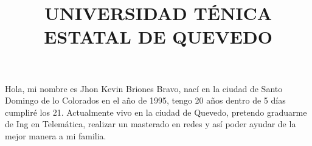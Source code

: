 \documentclass[20]{article}
\title{UNIVERSIDAD T\'ENICA ESTATAL DE QUEVEDO}
\begin{document}
\maketitle{} Hola, mi nombre es Jhon Kevin Briones Bravo, nac\'i en la ciudad de Santo Domingo de lo Colorados en el a\~no de 1995, tengo 20 a\~nos dentro de 5 d\'ias cumplir\'e los 21. Actualmente vivo en la ciudad de Quevedo, pretendo graduarme de Ing en Telem\'atica, realizar un masterado en redes y as\'i poder ayudar de la mejor manera a mi familia.
\newline
\end{document}
